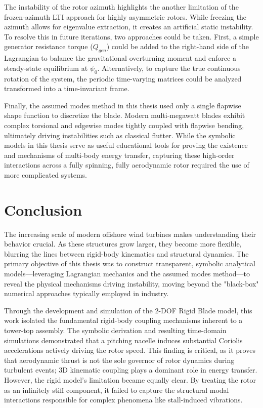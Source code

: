 \documentclass[final,onecolumn]{IEEEtran}
\begin{document}
The instability of the rotor azimuth highlights the another limitation of the frozen-azimuth LTI approach for highly asymmetric rotors. While freezing the azimuth allows for eigenvalue extraction, it creates an artificial static instability. To resolve this in future iterations, two approaches could be taken. First, a simple generator resistance torque ($Q_{gen}$) could be added to the right-hand side of the Lagrangian to balance the gravitational overturning moment and enforce a steady-state equilibrium at $\psi_0$. Alternatively, to capture the true continuous rotation of the system, the periodic time-varying matrices could be analyzed transformed into a time-invariant frame.

Finally, the assumed modes method in this thesis used only a single flapwise shape function to discretize the blade. Modern multi-megawatt blades exhibit complex torsional and edgewise modes tightly coupled with flapwise bending, ultimately driving instabilities such as classical flutter. While the symbolic models in this thesis serve as useful educational tools for proving the existence and mechanisms of multi-body energy transfer, capturing these high-order interactions across a fully spinning, fully aerodynamic rotor required the use of more complicated systems.

\section{Conclusion}
\label{sec:conclusion}

The increasing scale of modern offshore wind turbines makes understanding their behavior crucial. As these structures grow larger, they become more flexible, blurring the lines between rigid-body kinematics and structural dynamics. The primary objective of this thesis was to construct transparent, symbolic analytical models—leveraging Lagrangian mechanics and the assumed modes method—to reveal the physical mechanisms driving instability, moving beyond the "black-box" numerical approaches typically employed in industry.

Through the development and simulation of the 2-DOF Rigid Blade model, this work isolated the fundamental rigid-body coupling mechanisms inherent to a tower-top assembly. The symbolic derivation and resulting time-domain simulations demonstrated that a pitching nacelle induces substantial Coriolis accelerations actively driving the rotor speed. This finding is critical, as it proves that aerodynamic thrust is not the sole governor of rotor dynamics during turbulent events; 3D kinematic coupling plays a dominant role in energy transfer. However, the rigid model's limitation became equally clear. By treating the rotor as an infinitely stiff component, it failed to capture the structural modal interactions responsible for complex phenomena like stall-induced vibrations.
\end{document}
